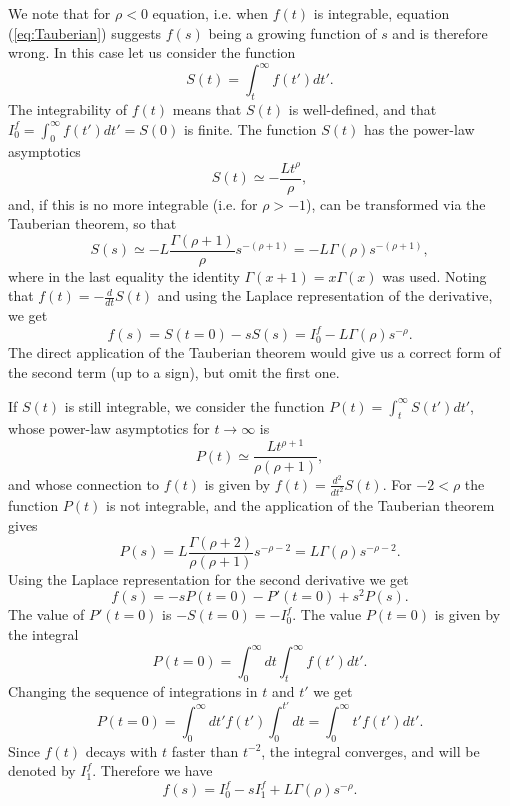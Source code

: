 We note that for $\rho < 0$  equation, i.e. when $f(t)$ is integrable, equation (\ref{eq:Tauberian}) suggests $f(s)$ being a growing function of $s$ and is therefore wrong. In this case let us consider the function
\begin{equation}
 S(t) = \int_t^\infty f(t') dt'.
\end{equation}
The integrability of $f(t)$ means that $S(t)$ is well-defined, and that $I_0^{f} =  \int_0^\infty f(t') dt' = S(0)$ is finite. 
The function $S(t)$ has the power-law asymptotics
%
\begin{equation}
 S(t) \simeq - \frac{L t^\rho}{\rho},
\end{equation}
and, if this is no more integrable (i.e. for $\rho > -1$), can be transformed via the Tauberian theorem, so that
\begin{equation}
 S(s) \simeq - L \frac{\Gamma(\rho+1)}{\rho} s^{-(\rho +1)} = - L \Gamma(\rho)  s^{-(\rho +1)},
\end{equation}
%
where in the last equality the identity $\Gamma(x+1) = x \Gamma(x)$ was used. 
Noting that $f(t) = - \frac{d}{dt}S(t)$ and using the Laplace representation of the derivative, we get 
\begin{equation}
 f(s) = S(t=0) - s S(s) = I^{f}_0 - L \Gamma(\rho)  s^{-\rho} .
\end{equation}
The direct application of the Tauberian theorem would give us a correct form of the second term (up to a sign), but omit the first one. 

If $S(t)$ is still integrable, we consider the function $P(t) = \int_t^\infty S(t') dt'$, whose power-law asymptotics for $t \to \infty$ is
\begin{equation}
 P(t) \simeq \frac{L t^{\rho+1}}{\rho (\rho+1)},
\end{equation}
and whose connection to $f(t)$ is given by $f(t) = \frac{d^2}{dt^2}S(t)$. For $-2 < \rho$ the function $P(t)$ is not integrable, 
and the application of the Tauberian theorem gives
\begin{equation}
 P(s) = L \frac{\Gamma(\rho+2)}{\rho (\rho+1)} s^{-\rho-2} = L \Gamma(\rho) s^{-\rho-2}.
\end{equation}
Using the Laplace representation for the second derivative we get
\begin{equation}
 f(s) = - s P(t=0) - P'(t=0) + s^2 P(s). 
\end{equation}
The value of $P'(t=0)$ is $-S(t=0)=-I^{f}_0$. The value $P(t=0)$ is given by the integral
\begin{equation}
P(t=0) = \int_0^\infty dt \int_t^\infty f(t')dt'.
\end{equation}
Changing the sequence of integrations in $t$ and $t'$ we get 
\begin{equation}
 P(t=0) = \int_0^\infty dt' f(t') \int_0^{t'} dt = \int_0^\infty t' f(t') dt'.
\end{equation}
Since $f(t)$ decays with $t$ faster than $t^{-2}$, the integral converges, and will be denoted by $I^{f}_1$. Therefore we have
%
\begin{equation}
 f(s) = I^{f}_0 - s I^{f}_1 + L \Gamma(\rho) s^{-\rho}.
\end{equation}

